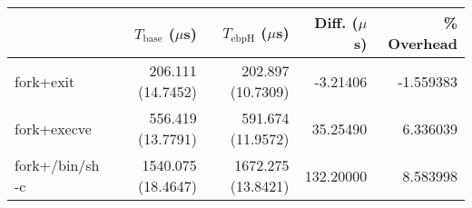 \begin{tabular}{>{\ttfamily}lrrrr}
\toprule
\multicolumn{1}{l}{Process} & $T_\text{base}$ ($\mu$s) & $T_\text{ebpH}$ ($\mu$s) &  Diff. ($\mu$s) &  \% Overhead \\
\midrule
                  fork+exit &        206.111 (14.7452) &        202.897 (10.7309) &        -3.21406 &    -1.559383 \\
                fork+execve &        556.419 (13.7791) &        591.674 (11.9572) &        35.25490 &     6.336039 \\
            fork+/bin/sh -c &       1540.075 (18.4647) &       1672.275 (13.8421) &       132.20000 &     8.583998 \\
\bottomrule
\end{tabular}
